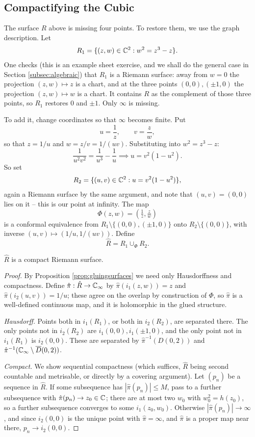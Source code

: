 \documentclass[a4paper]{scrartcl}
\newcommand{\Cinf}{\C_\infty}
\begin{document}
\subsection{Compactifying the Cubic}\label{subsec:compactifycubic}

The surface $R$ above is missing four points. To restore them, we use the graph
description. Let
$$
R_1 = \{(z,w) \in \mathbb{C}^2 : w^2 = z^3 - z\}.
$$
One checks (this is an example sheet exercise, and we shall do the general case in Section
\ref{subsec:algebraic}) that $R_1$ is a Riemann surface: away from $w=0$ the projection
$(z,w)\mapsto z$ is a chart, and at the three points $(0,0),(\pm 1, 0)$ the projection
$(z,w)\mapsto w$ is a chart. It contains $R$ as the complement of those three points, so
$R_1$ restores $0$ and $\pm 1$. Only $\infty$ is missing.

To add it, change coordinates so that $\infty$ becomes finite. Put
$$
u = \frac{1}{z}, \qquad v = \frac{z}{w},
$$
so that $z = 1/u$ and $w = z/v = 1/(uv)$. Substituting into $w^2 = z^3 - z$:
$$
\frac{1}{u^2v^2} = \frac{1}{u^3} - \frac1u \implies u = v^2(1 - u^2).
$$
So set
$$
R_2 = \{(u,v)\in\mathbb{C}^2 : u = v^2(1-u^2)\},
$$
again a Riemann surface by the same argument, and note that $(u,v) = (0,0)$ lies on it --
this is our point at infinity. The map
$$
\Phi(z,w) = \left(\tfrac1z, \tfrac zw\right)
$$
is a conformal equivalence from $R_1 \setminus \{(0,0),(\pm1,0)\}$ onto
$R_2 \setminus \{(0,0)\}$, with inverse $(u,v)\mapsto (1/u, 1/(uv))$. Define
$$
\hat R = R_1 \cup_\Phi R_2.
$$

\begin{proposition}
	$\hat R$ is a compact Riemann surface.
\end{proposition}

\begin{proof}
	By Proposition \ref{prop:gluingsurfaces} we need only Hausdorffness and compactness.
	Define $\hat\pi : \hat R \to \Cinf$ by $\hat\pi(i_1(z,w)) = z$ and
	$\hat\pi(i_2(u,v)) = 1/u$; these agree on the overlap by construction of $\Phi$, so
	$\hat\pi$ is a well-defined continuous map, and it is holomorphic in the glued
	structure.

	\emph{Hausdorff.} Points both in $i_1(R_1)$, or both in $i_2(R_2)$, are separated
	there. The only points not in $i_2(R_2)$ are $i_1(0,0), i_1(\pm1,0)$, and the only
	point not in $i_1(R_1)$ is $i_2(0,0)$. These are separated by
	$\hat\pi^{-1}(D(0,2))$ and $\hat\pi^{-1}(\Cinf\setminus \overline D(0,2))$.

	\emph{Compact.} We show sequential compactness (which suffices, $\hat R$ being
	second countable and metrisable, or directly by a covering argument). Let $(p_n)$ be a
	sequence in $\hat R$. If some subsequence has $|\hat\pi(p_n)| \leq M$, pass to a further
	subsequence with $\hat\pi(p_n) \to z_0 \in \mathbb{C}$; there are at most two $w_0$ with
	$w_0^2 = h(z_0)$, so a further subsequence converges to some $i_1(z_0,w_0)$. Otherwise
	$|\hat\pi(p_n)|\to\infty$, and since $i_2(0,0)$ is the unique point with
	$\hat\pi = \infty$, and $\hat\pi$ is a proper map near there, $p_n \to i_2(0,0)$.
\end{proof}
\end{document}
